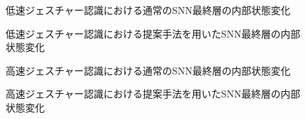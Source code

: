 \begin{figure}[htbp] %
    \centering
    
    \caption{
        低速ジェスチャー認識における通常のSNN最終層の内部状態変化
        }
    \label{fig:discussion2:snn:a5}
\end{figure}

\begin{figure}[htbp] %
    \centering
    
    \caption{
        低速ジェスチャー認識における提案手法を用いたSNN最終層の内部状態変化
        }
    \label{fig:discussion2:dyna:a5}
\end{figure}

\begin{figure}[htbp] %
    \centering
    
    \caption{
        高速ジェスチャー認識における通常のSNN最終層の内部状態変化
        }
    \label{fig:discussion2:snn:a05}
\end{figure}

\begin{figure}[htbp] %
    \centering
    
    \caption{
        高速ジェスチャー認識における提案手法を用いたSNN最終層の内部状態変化
        }
    \label{fig:discussion2:dyna:a05}
\end{figure}


\clearpage